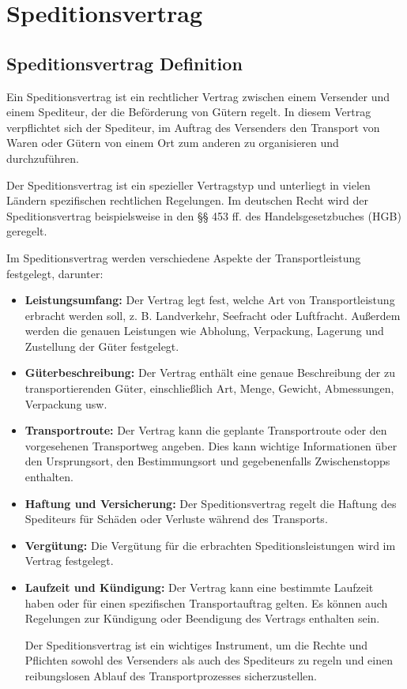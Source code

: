 
    \chapter[Speditionsvertrag]{Speditionsvertrag}

    \section{Speditionsvertrag Definition}

    Ein Speditionsvertrag ist ein rechtlicher Vertrag zwischen einem Versender  und einem Spediteur, der die Beförderung von Gütern regelt. In diesem Vertrag verpflichtet sich der Spediteur, im Auftrag des Versenders den Transport von Waren oder Gütern von einem Ort zum anderen zu organisieren und durchzuführen.

    Der Speditionsvertrag ist ein spezieller Vertragstyp und unterliegt in vielen Ländern spezifischen rechtlichen Regelungen. Im deutschen Recht wird der Speditionsvertrag beispielsweise in den §§ 453 ff. des Handelsgesetzbuches (HGB) geregelt.

    Im Speditionsvertrag werden verschiedene Aspekte der Transportleistung festgelegt, darunter:
    \begin{itemize}
        \item \textbf{Leistungsumfang:} Der Vertrag legt fest, welche Art von Transportleistung erbracht werden soll, z. B. Landverkehr, Seefracht oder Luftfracht. Außerdem werden die genauen Leistungen wie Abholung, Verpackung, Lagerung und Zustellung der Güter festgelegt.
        \item \textbf{Güterbeschreibung:} Der Vertrag enthält eine genaue Beschreibung der zu transportierenden Güter, einschließlich Art, Menge, Gewicht, Abmessungen, Verpackung usw.
        \item \textbf{Transportroute:} Der Vertrag kann die geplante Transportroute oder den vorgesehenen Transportweg angeben. Dies kann wichtige Informationen über den Ursprungsort, den Bestimmungsort und gegebenenfalls Zwischenstopps enthalten.
        \item \textbf{Haftung und Versicherung:} Der Speditionsvertrag regelt die Haftung des Spediteurs für Schäden oder Verluste während des Transports.
        \item \textbf{Vergütung:} Die Vergütung für die erbrachten Speditionsleistungen wird im Vertrag festgelegt.
        \item \textbf{Laufzeit und Kündigung:} Der Vertrag kann eine bestimmte Laufzeit haben oder für einen spezifischen Transportauftrag gelten. Es können auch Regelungen zur Kündigung oder Beendigung des Vertrags enthalten sein.

    Der Speditionsvertrag ist ein wichtiges Instrument, um die Rechte und Pflichten sowohl des Versenders als auch des Spediteurs zu regeln und einen reibungslosen Ablauf des Transportprozesses sicherzustellen.
\end{itemize}
